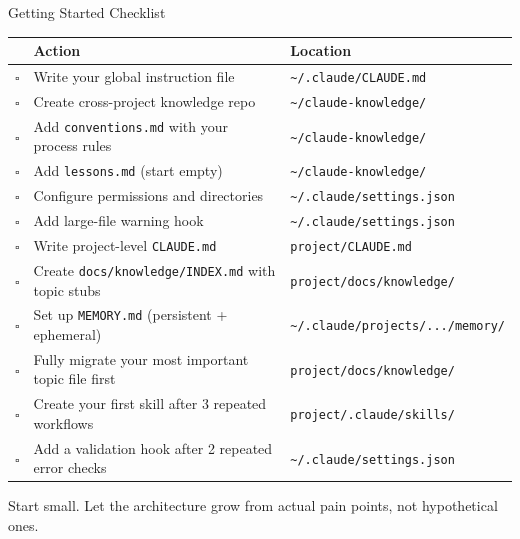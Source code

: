 \documentclass[aspectratio=169,11pt]{beamer}
\begin{document}
\begin{frame}[shrink=15]{Getting Started Checklist}

\renewcommand{\arraystretch}{1.2}
\small
\begin{tabular}{@{}c l l@{}}
  \toprule
  & \textbf{Action} & \textbf{Location} \\
  \midrule
  $\square$ & Write your global instruction file & \texttt{\textasciitilde/.claude/CLAUDE.md} \\
  $\square$ & Create cross-project knowledge repo & \texttt{\textasciitilde/claude-knowledge/} \\
  $\square$ & Add \texttt{conventions.md} with your process rules & \texttt{\textasciitilde/claude-knowledge/} \\
  $\square$ & Add \texttt{lessons.md} (start empty) & \texttt{\textasciitilde/claude-knowledge/} \\
  $\square$ & Configure permissions and directories & \texttt{\textasciitilde/.claude/settings.json} \\
  $\square$ & Add large-file warning hook & \texttt{\textasciitilde/.claude/settings.json} \\
  \midrule
  $\square$ & Write project-level \texttt{CLAUDE.md} & \texttt{project/CLAUDE.md} \\
  $\square$ & Create \texttt{docs/knowledge/INDEX.md} with topic stubs & \texttt{project/docs/knowledge/} \\
  $\square$ & Set up \texttt{MEMORY.md} (persistent + ephemeral) & \texttt{\textasciitilde/.claude/projects/.../memory/} \\
  $\square$ & Fully migrate your most important topic file first & \texttt{project/docs/knowledge/} \\
  \midrule
  $\square$ & Create your first skill after 3 repeated workflows & \texttt{project/.claude/skills/} \\
  $\square$ & Add a validation hook after 2 repeated error checks & \texttt{\textasciitilde/.claude/settings.json} \\
  \bottomrule
\end{tabular}

\bigskip

\begin{exampleblock}{}
\centering\small
Start small. Let the architecture grow from actual pain points, not hypothetical ones.
\end{exampleblock}

\end{frame}
\end{document}
